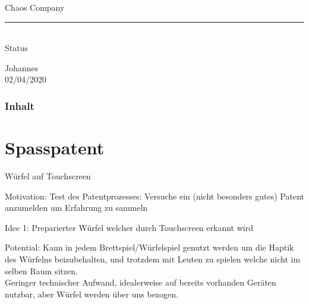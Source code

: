 \documentclass{beamer}
\begin{document}
{
\begin{frame}
	\vspace{0.7cm}
	\begin{mdframed}[tikzsetting={draw=lkb,fill=white,fill opacity=0.7, line width=4}, backgroundcolor=none, 							   leftmargin=0, rightmargin=0, innertopmargin=10]
		\vspace{0.5cm}
		{\Large{
  		\begin{center}Chaos Company\\[0.25cm]
                      \rule{5cm}{0.1cm}\\[0.25cm]
                      Status
        \end{center}
		}}
  		\vspace{0.75cm}
  		\centering
  		{\small{
  		\hspace{1cm} Johannes \hspace{1cm}\phantom{}\\
  		\phantom{}\hspace{1cm} 02/04/2020 \hspace{1cm}\phantom{}\\
  		}}
	\end{mdframed}

\end{frame}
}

\begin{frame}
\frametitle{Inhalt}
\tableofcontents[]
\end{frame}

\section{Spasspatent}

\begin{frame}{W\"urfel auf Touchscreen}



\begin{block}{Motivation:}
Test des Patentprozesses: Versuche ein (nicht besonders gutes) Patent anzumelden um Erfahrung zu sammeln
\end{block}


\begin{exampleblock}{Idee 1:}
Preparierter W\"urfel welcher durch Touchscreen erkannt wird
\end{exampleblock}

\begin{alertblock}{Potential:}
Kann in jedem Brettspiel/W\"urfelspiel genutzt werden um die Haptik des W\"urfelns beizubehalten, und trotzdem mit Leuten zu spielen welche nicht im selben Raum sitzen.\\
Geringer technischer Aufwand, idealerweise auf bereits vorhanden Ger\"aten nutzbar, aber W\"urfel werden \"uber uns bezogen.
\end{alertblock}

\end{frame}
\end{document}

